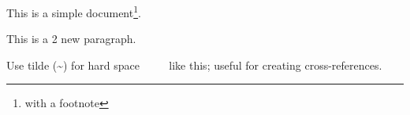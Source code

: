 \documentclass[a4paper, 12pt]{article}
\begin{document}


This is a       simple document\footnote{with a footnote}.


This is a 2 new paragraph.

Use tilde (\textasciitilde) for hard space ~~~~ like this; useful for creating cross-references.
\end{document}
